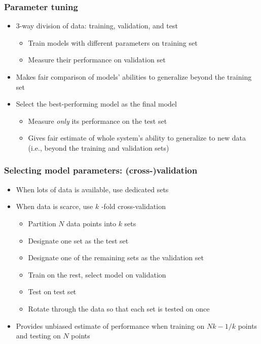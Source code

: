 \documentclass[12pt,notes,mathserif]{beamer}
\begin{document}
\begin{frame}[c]
	\frametitle{Parameter tuning}
	\begin{itemize}
		\item  3-way division of data: training, validation, and test
		      \begin{itemize}
			      \item  Train models with different parameters on training set
			      \item Measure their performance on validation set
		      \end{itemize}
		\item  Makes fair comparison of models' abilities to generalize beyond the training set

		\item  Select the best-performing model as the final model
		      \begin{itemize}
			      \item  Measure \textit{only} its performance on the test set
			      \item Gives fair estimate of whole system's ability to generalize to new data (i.e., beyond the training and validation sets)
		      \end{itemize}
	\end{itemize}
\end{frame}


\begin{frame}[c]
	\frametitle{Selecting model parameters: (cross-)validation}
	\begin{itemize}
		\item  When lots of data is available, use dedicated sets
		\item  When data is scarce, use $k$ -fold cross-validation
		      \begin{itemize}
			      \item  Partition $N$ data points into $k$ sets
			      \item Designate one set as the test set
			      \item Designate one of the remaining sets as the validation set
			      \item Train on the rest, select model on validation
			      \item Test on test set
			      \item Rotate through the data so that each set is tested on once
		      \end{itemize}

		\item  Provides unbiased estimate of performance when training on $N{k-1}/{k}$ points and testing on $N$ points
	\end{itemize}
\end{frame}
\end{document}
